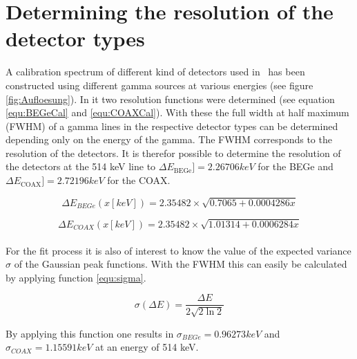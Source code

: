 \appendix

\chapter{Determining the resolution of the detector types}
\label{sec:ResDetermination}


A calibration spectrum of different kind of detectors used in \gerda\ has been constructed using different gamma sources at various energies (see figure \ref{fig:Aufloesung})\cite{agostini_background_2017}.
In it two resolution functions were determined (see equation \ref{equ:BEGeCal} and \ref{equ:COAXCal}).
With these the full width at half maximum (FWHM) of a gamma lines in the respective detector types can be determined depending only on the energy of the gamma.
The FWHM corresponds to the resolution of the detectors.
It is therefor possible to determine the resolution of the detectors at the 514 keV line to $\Delta E_{\mathrm{BEGe}}] =2.26706\unit{keV}$ for the BEGe and $\Delta E_{\mathrm{COAX}}] = 2.72196\unit{keV}$ for the COAX.



\begin{equation}
\Delta E_{BEGe}(x[keV]) = 2.35482 \times \sqrt{0.7065+0.0004286x}
\label{equ:BEGeCal}
\end{equation}

\begin{equation}
\Delta E_{COAX}(x[keV]) = 2.35482 \times \sqrt{1.01314+0.0006284x}
\label{COAXCal}
\end{equation}
\\

For the fit process it is also of interest to know the value of the expected variance $\sigma$ of the Gaussian peak functions.
With the FWHM this can easily be calculated by applying function \ref{equ:sigma}.

\begin{equation}
\sigma (\Delta E) = \frac{\Delta E}{2\sqrt{2\ln2}}
\label{equ:sigma}
\end{equation}

By applying this function one results in $\sigma_{BEGe} = 0.96273\unit{keV}$ and $\sigma_{COAX} = 1.15591\unit{keV}$ at an energy of 514 keV.

